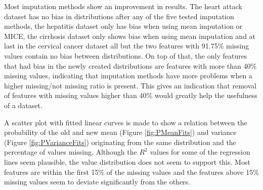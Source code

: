 \documentclass[10pt,a4paper]{report}
\begin{document}
\begin{table}[]
\begin{tabular}{l|ll|lll|ll}
		\end{tabular}
	\end{table}
	
	Most imputation methods show an improvement in results. The heart attack dataset has no bias in distributions after any of the five tested imputation methods, the hepatitis dataset only has bias when using mean imputation or MICE, the cirrhosis dataset only shows bias when using mean imputation and at last in the cervical cancer dataset all but the two features with 91.75\% missing values contain no bias between distributions. On top of that, the only features that had bias in the newly created distributions are features with more than 40\% missing values, indicating that imputation methods have more problems when a higher missing/not missing ratio is present. This gives an indication that removal of features with missing values higher than 40\% would greatly help the usefulness of a dataset.
	
	A scatter plot with fitted linear curves is made to show a relation between the probability of the old and new mean (Figure \ref{fig:PMeanFits}) and variance (Figure \ref{fig:PVarianceFits}) originating from the same distribution and the percentage of values missing. Although the $R^2$ values for some of the regression lines seem plausible, the value distribution does not seem to support this. Most features are within the first 15\% of the missing values and the features above 15\% missing values seem to deviate significantly from the others.
	
\end{document}
